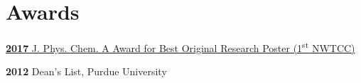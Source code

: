 \documentclass[letterpaper]{radler-resume-class}
\begin{document}
\begin{minipage}[t]{0.65\textwidth}
%
\section{Awards} 
\sectionspace
\begin{tightitemize}
\item \href{https://www.newswise.com/doescience/?article_id=684936&returnurl=aHR0cHM6Ly93d3cubmV3c3dpc2UuY29tL2FydGljbGVzL2xpc3Q=}{\textbf{2017} J. Phys. Chem. A Award for Best Original Research Poster (1\textsuperscript{st} NWTCC) }
\item \textbf{2012} Dean's List, Purdue University
\end{tightitemize}


\end{minipage}
\end{document}
